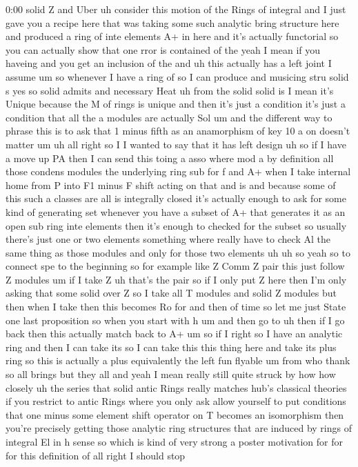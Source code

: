 \begin{unfinished}{0:00}
solid
Z  and
Uber  uh  consider  this  motion  of  the
Rings  of
integral
and  I  just  gave  you  a  recipe  here  that
was  taking  some  such  analytic  bring
structure  here  and  produced  a  ring  of
inte  elements  A+  in
here
and  it's  actually  functorial  so  you  can
actually  show
that  one  rror  is  contained  of
the  yeah  I  mean  if  you  haveing  and  you
get  an  inclusion  of
the  and  uh  this  actually  has
a  left  joint  I  assume
um  so  whenever  I  have  a  ring  of  so  I  can
produce  and  musicing
stru
solid  s
yes  so  solid
admits  and  necessary  Heat
uh  from  the
solid  solid
is  I  mean  it's  Unique  because  the  M  of
rings  is  unique  and  then  it's  just  a
condition  it's  just  a  condition  that  all
the  a  modules  are  actually
Sol
um  and  the  different  way  to  phrase  this
is  to  ask  that  1  minus
fifth  as  an  anamorphism  of  key
10
a
on  doesn't  matter
um
uh  all  right  so  I  I  wanted  to  say  that
it  has  left  design  uh
so  if  I  have  a  move  up
PA
then  I  can  send  this
toing
a
asso  where  mod
a  by  definition  all  those  condens
modules  the  underlying
ring
sub  for  f  and
A+  when  I  take  internal  home  from  P
into
F1  minus  F  shift  acting  on
that  and
is
and  because  some  of  this  such  a  classes
are  all  is  integrally  closed  it's
actually  enough  to  ask  for  some  kind  of
generating  set  whenever  you  have  a
subset  of  A+  that  generates  it  as  an
open  sub  ring  inte  elements  then  it's
enough  to  checked  for  the  subset  so
usually  there's  just  one  or  two  elements
something  where  really  have  to
check
Al  the  same  thing  as  those  modules
and  only  for  those  two  elements
uh
uh  so  yeah  so  to  connect  spe  to  the
beginning  so  for  example  like  Z  Comm  Z
pair  this  just  follow  Z  modules  um  if  I
take  Z
uh  that's  the
pair  so  if  I  only  put  Z  here  then  I'm
only  asking  that  some  solid  over  Z  so  I
take  all  T  modules  and  solid  Z  modules
but  then  when  I
take  then  this  becomes  Ro
for  and  then  of  time  so  let  me  just
State  one  last
proposition
so  when  you  start  with
h
um  and  then  go
to
uh  then  if  I  go  back  then  this  actually
match  back  to
A+
um  so  if  I  right  so  I  have  an  analytic
ring  and  then  I  can  take
its  so  I  can  take  this  this  thing  here
and  take  its  plus  ring  so  this  is
actually  a  plus
equivalently  the  left  fun
flyable
um  from
who  thank
so  all  brings  but  they
all  and  yeah  I  mean  really  still  quite
struck  by  how  how  closely  uh  the  series
that  solid  antic  Rings  really  matches
hub's  classical  theories  if  you  restrict
to  antic  Rings  where  you  only  ask  allow
yourself  to  put  conditions  that  one
minus  some  element  shift  operator  on  T
becomes  an
isomorphism  then  you're  precisely
getting  those  analytic  ring  structures
that  are  induced  by  rings  of  integral  El
in  h  sense  so  which  is  kind  of  very
strong  a  poster  motivation  for  for  for
this  definition
of  all  right  I  should
stop
\end{unfinished}